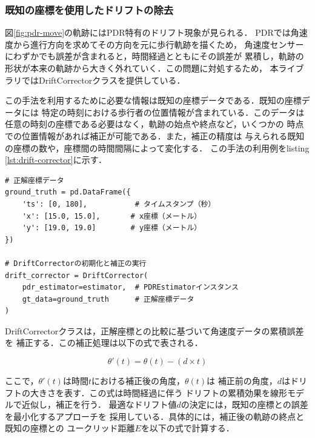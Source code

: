 \subsubsection{既知の座標を使用したドリフトの除去}

図\ref{fig:pdr-move}の軌跡にはPDR特有のドリフト現象が見られる．
PDRでは角速度から進行方向を求めてその方向を元に歩行軌跡を描くため，
角速度センサーにわずかでも誤差が含まれると，時間経過とともにその誤差が
累積し，軌跡の形状が本来の軌跡から大きく外れていく．この問題に対処するため，
本ライブラリではDriftCorrectorクラスを提供している．

この手法を利用するために必要な情報は既知の座標データである．既知の座標データには
特定の時刻における歩行者の位置情報が含まれている．このデータは
任意の時刻の座標である必要はなく，軌跡の始点や終点など，いくつかの
時点での位置情報があれば補正が可能である．また，補正の精度は
与えられる既知の座標の数や，座標間の時間間隔によって変化する．
この手法の利用例をlisting \ref{lst:drift-corrector}に示す．


\begin{lstlisting}[caption={DriftCorrectorの使用例},label=lst:drift-corrector,float=h]
# 正解座標データ
ground_truth = pd.DataFrame({
    'ts': [0, 180],           # タイムスタンプ（秒）
    'x': [15.0, 15.0],       # x座標（メートル）
    'y': [19.0, 19.0]        # y座標（メートル）
})

# DriftCorrectorの初期化と補正の実行
drift_corrector = DriftCorrector(
    pdr_estimator=estimator,  # PDREstimatorインスタンス
    gt_data=ground_truth      # 正解座標データ
)
\end{lstlisting}



DriftCorrectorクラスは，正解座標との比較に基づいて角速度データの累積誤差を
補正する．この補正処理は以下の式で表される．

\begin{equation}
    \theta'(t) = \theta(t) - (d \times t)
\end{equation}

ここで，$\theta'(t)$は時間$t$における補正後の角度，$\theta(t)$は
補正前の角度，$d$はドリフトの大きさを表す．この式は時間経過に伴う
ドリフトの累積効果を線形モデルで近似し，補正を行う．
最適なドリフト値$d$の決定には，既知の座標との誤差を最小化するアプローチを
採用している．具体的には，補正後の軌跡の終点と既知の座標との
ユークリッド距離$E$を以下の式で計算する．

